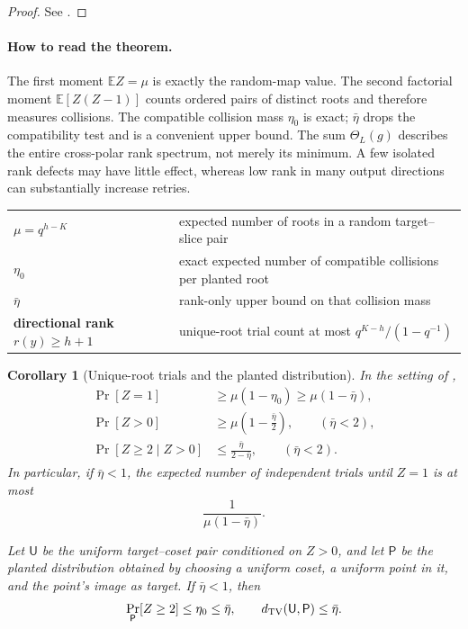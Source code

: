 \documentclass[11pt]{article}
\newtheorem{corollary}[corollary]{Corollary}
\begin{document}
\begin{proof}
See .
\end{proof}

\paragraph{How to read the theorem.}
The first moment $\mathbb EZ=\mu$ is exactly the random-map value.  The second
factorial moment $\mathbb E[Z(Z-1)]$ counts ordered pairs of distinct roots and
therefore measures collisions.  The compatible collision mass $\eta_0$ is
exact; $\bar\eta$ drops the compatibility test and is a convenient upper
bound.  The sum $\Theta_L(g)$ describes the entire cross-polar rank spectrum,
not merely its minimum.  A few isolated rank defects may have little effect,
whereas low rank in many output directions can substantially increase retries.

\begin{center}
\begin{tabularx}{0.92\textwidth}{@{}>{\bfseries}p{}X@{}}
$\mu=q^{h-K}$ & expected number of roots in a random target--slice pair\\
$\eta_0$ & exact expected number of compatible collisions per planted root\\
$\bar\eta$ & rank-only upper bound on that collision mass\\
directional rank $r(y)\ge h+1$ & unique-root trial count at most
$q^{K-h}/(1-q^{-1})$
\end{tabularx}
\end{center}

\begin{corollary}[Unique-root trials and the planted distribution]
\label{cor:singleton-coset}
In the setting of ,
\begin{align}
 \Pr[Z=1]&\ge\mu(1-\eta_0)
             \ge\mu(1-\bar\eta),\label{eq:singleton-coset}\\
 \Pr[Z>0]&\ge\mu\left(1-\frac{\bar\eta}{2}\right),
 \qquad (\bar\eta<2),\label{eq:bonferroni-success}\\
 \Pr[Z\ge2\mid Z>0]&\le\frac{\bar\eta}{2-\bar\eta},
 \qquad (\bar\eta<2).\label{eq:conditional-multiple}
\end{align}
In particular, if $\bar\eta<1$, the expected number of independent trials
until $Z=1$ is at most
\begin{equation}\label{eq:unique-retry-general}
 \frac{1}{\mu(1-\bar\eta)}.
\end{equation}

Let $\mathsf U$ be the uniform target--coset pair conditioned on $Z>0$, and
let $\mathsf P$ be the planted distribution obtained by choosing a uniform
coset, a uniform point in it, and the point's image as target.  If
$\bar\eta<1$, then
\begin{equation}\label{eq:planted-tv}
 \Pr_{\mathsf P}[Z\ge2]\le\eta_0\le\bar\eta,
 \qquad
 d_{\rm TV}(\mathsf U,\mathsf P)\le\bar\eta.
\end{equation}
\end{corollary}
\end{document}
